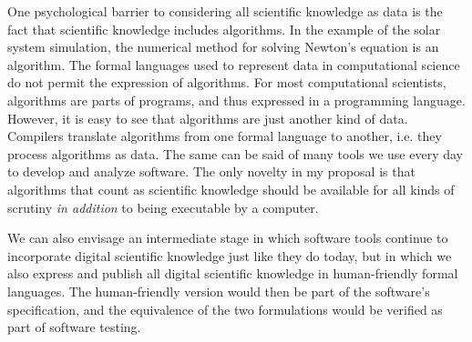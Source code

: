 One psychological barrier to considering all scientific knowledge as data is the fact that scientific knowledge includes algorithms. In the example of the solar system simulation, the numerical method for solving Newton's equation is an algorithm. The formal languages used to represent data in computational science do not permit the expression of algorithms. For most computational scientists, algorithms are parts of programs, and thus expressed in a programming language. However, it is easy to see that algorithms are just another kind of data. Compilers translate algorithms from one formal language to another, i.e. they process algorithms as data. The same can be said of many tools we use every day to develop and analyze software. The only novelty in my proposal is that algorithms that count as scientific knowledge should be available for all kinds of scrutiny \textit{in addition} to being executable by a computer.

We can also envisage an intermediate stage in which software tools continue to incorporate digital scientific knowledge just like they do today, but in which we also express and publish all digital scientific knowledge in human-friendly formal languages. The human-friendly version would then be part of the software's specification, and the equivalence of the two formulations would be verified as part of software testing.

